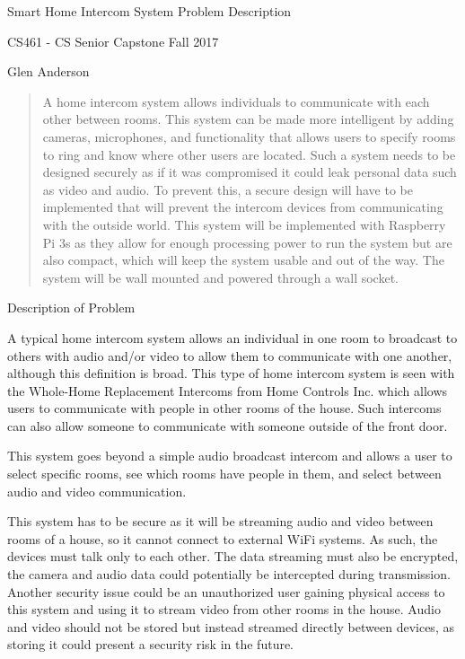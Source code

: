 \documentclass{article}
\begin{document}
\centerline{\sc Smart Home Intercom System Problem Description}

\centerline{\sc CS461 - CS Senior Capstone Fall 2017}

\centerline{\sc Glen Anderson}

\vspace{5cm}


\begin{abstract}

\noindent A home intercom system allows individuals to communicate with each other between rooms. This system can be made more intelligent by adding cameras, microphones, and functionality that allows users to specify rooms to ring and know where other users are located. Such a system needs to be designed securely as if it was compromised it could leak personal data such as video and audio. To prevent this, a secure design will have to be implemented that will prevent the intercom devices from communicating with the outside world. This system will be implemented with Raspberry Pi 3s as they allow for enough processing power to run the system but are also compact, which will keep the system usable and out of the way. The system will be wall mounted and powered through a wall socket. 


\end{abstract}

\newpage

Description of Problem
\vspace{1cm}

A typical home intercom system allows an individual in one room to broadcast to others with audio and/or video to allow them to communicate with one another, although this definition is broad. This type of home intercom system is seen with the Whole-Home Replacement Intercoms from Home Controls Inc. which allows users to communicate with people in other rooms of the house. Such intercoms can also allow someone to communicate with someone outside of the front door. 

This system goes beyond a simple audio broadcast intercom and allows a user to select specific rooms, see which rooms have people in them, and select between audio and video communication. 

This system has to be secure as it will be streaming audio and video between rooms of a house, so it cannot connect to external WiFi systems. As such, the devices must talk only to each other. The data streaming must also be encrypted, the camera and audio data could potentially be intercepted during transmission. Another security issue could be an unauthorized user gaining physical access to this system and using it to stream video from other rooms in the house. Audio and video should not be stored but instead streamed directly between devices, as storing it could present a security risk in the future. 
\end{document}
